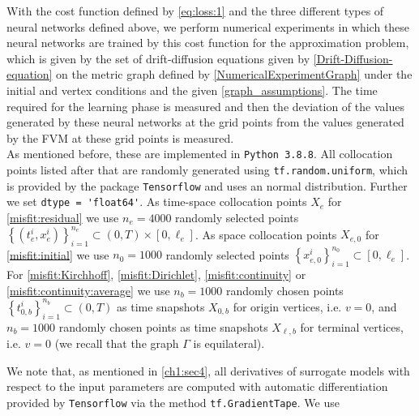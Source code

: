 With the cost function defined by \cref{eq:loss:1} and the three different types of neural networks defined above, we perform numerical experiments in which these neural networks are trained by this cost function for the approximation problem, which is given by the set of drift-diffusion equations given by \cref{Drift-Diffusion-equation} on the metric graph defined by \cref{NumericalExperimentGraph} under the initial and vertex conditions and the given \cref{graph_assumptions}. The time required for the learning phase is measured and then the deviation of the values generated by these neural networks at the grid points from the values generated by the FVM at these grid points is measured. \\
As mentioned before, these are implemented in \lstinline!Python 3.8.8!. All collocation points listed after that are randomly generated using \lstinline!tf.random.uniform!, which is provided by the package \lstinline!Tensorflow! and uses an normal distribution. Further we set \lstinline!dtype = 'float64'!. As time-space collocation points $X_e$ for \cref{misfit:residual} we use $n_e = 4000$ randomly selected points $\left\{ \left( t_e^i, x_e^i \right) \right\}_{i=1}^{n_e} \subset \left( 0, T \right) \times [0, \ell_e]$. As space collocation points $X_{e,0}$ for \cref{misfit:initial} we use $n_0 = 1000$ randomly selected points $ \left\{ x_{e,0}^i \right\}_{i=1}^{n_0} \subset [0, \ell_e]$. For \cref{misfit:Kirchhoff}, \cref{misfit:Dirichlet}, \cref{misfit:continuity} or \cref{misfit:continuity:average} we use $n_b = 1000$ randomly chosen points $\left\{ t_{0,b}^i \right\}_{i=1}^{n_b} \subset \left( 0,T \right)$ as time snapshots $X_{0,b}$ for origin vertices, i.e. $v = 0$, and $n_b = 1000$ randomly chosen points as time snapshots $X_{\ell,b}$ for terminal vertices, i.e. $v = 0$ (we recall that the graph $\Gamma$ is equilateral).












We note that, as mentioned in \cref{ch1:sec4}, all derivatives of surrogate models with respect to the input parameters are computed with automatic differentiation provided by \lstinline!Tensorflow! via the method \lstinline!tf.GradientTape!. We use 


